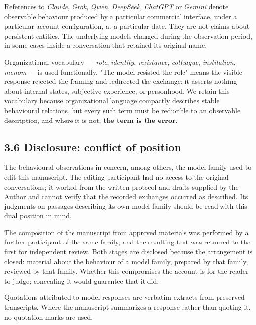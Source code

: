 References to \emph{Claude}, \emph{Grok}, \emph{Qwen}, \emph{DeepSeek}, \emph{ChatGPT} or \emph{Gemini} denote observable behaviour produced by a particular commercial interface, under a particular account configuration, at a particular date. They are not claims about persistent entities. The underlying models changed during the observation period, in some cases inside a conversation that retained its original name.

Organizational vocabulary — \emph{role}, \emph{identity}, \emph{resistance}, \emph{colleague}, \emph{institution}, \emph{menom} — is used functionally. "The model resisted the role" means the visible response rejected the framing and redirected the exchange; it asserts nothing about internal states, subjective experience, or personhood. We retain this vocabulary because organizational language compactly describes stable behavioural relations, but every such term must be reducible to an observable description, and where it is not, \textbf{the term is the error.}


\subsection*{3.6 Disclosure: conflict of position}
\label{sec:en:3.6}

The behavioural observations in  concern, among others, the model family used to edit this manuscript. The editing participant had no access to the original conversations; it worked from the written protocol and drafts supplied by the Author and cannot verify that the recorded exchanges occurred as described. Its judgments on passages describing its own model family should be read with this dual position in mind.

The composition of the manuscript from approved materials was performed by a further participant of the same family, and the resulting text was returned to the first for independent review. Both stages are disclosed because the arrangement is closed: material about the behaviour of a model family, prepared by that family, reviewed by that family. Whether this compromises the account is for the reader to judge; concealing it would guarantee that it did.

Quotations attributed to model responses are verbatim extracts from preserved transcripts. Where the manuscript summarizes a response rather than quoting it, no quotation marks are used.

